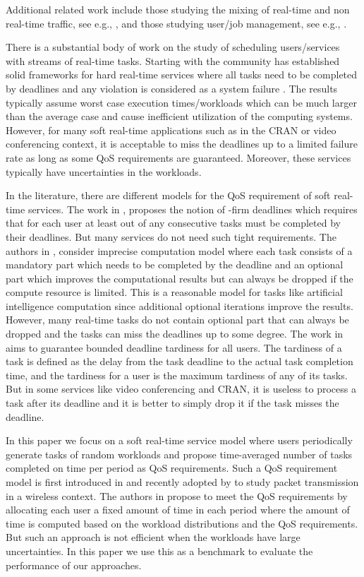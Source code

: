 \documentclass[prodmode,acmtompecs]{acmsmall}
\newcommand{\myComments}[1]{}
\newif\ifdissertation
\newcommand{\dissertationStart}{\ifdissertation  \myComments{Dissertation version: }}
\begin{document}
Additional related work include those studying the mixing of real-time and non real-time traffic, see e.g., \cite{ShS01,JaS11,PaD07}, 
and those studying user/job management, see e.g., 
\cite{AAB00,MTH11,DeK14}. 

\dissertationStart
There is a substantial body of work on the study of scheduling users/services with streams of real-time tasks. 
Starting with \cite{LiL73A} the community has established solid frameworks for hard real-time services where all tasks need to be completed by deadlines and any violation is considered as a system failure \cite{Liu00b} \cite{DaB11A}. The results typically assume worst case execution times/workloads which can be much larger than the average case and cause inefficient utilization of the computing systems. However, for many soft real-time applications such as in the CRAN or video conferencing context, it is acceptable to miss the deadlines up to a limited failure rate as long as some QoS requirements are guaranteed. Moreover, these services typically have uncertainties in the workloads. 

In the literature, there are different models for the QoS requirement of soft real-time services. The work in \cite{HaR95A}, \cite{BeB97A} proposes the notion of -firm deadlines which requires that for each user at least  out of any  consecutive tasks must be completed by their deadlines. But many services do not need such tight requirements. The authors in \cite{LLN87A}, \cite{HoK13bA} consider imprecise computation model where each task consists of a mandatory part which needs to be completed by the deadline and an optional part which improves the computational results but can always be dropped if the compute resource is limited. This is a reasonable model for tasks like artificial intelligence computation since additional optional iterations improve the results. However, many real-time tasks do not contain optional part that can always be dropped and the tasks can miss the deadlines up to some degree. The work in \cite{LiA09A} aims to guarantee bounded deadline tardiness for all users. The tardiness of a task is defined as the delay from the task deadline to the actual task completion time, and the tardiness for a user is the maximum tardiness of any of its tasks. But in some services like video conferencing and CRAN, it is useless to process a task after its deadline and it is better to simply drop it if the task misses the deadline. 

In this paper we focus on a soft real-time service model where users periodically generate tasks of random workloads and propose time-averaged number of tasks completed on time per period as QoS requirements. Such a QoS requirement model is first introduced in \cite{AtB98A} and recently adopted by \cite{HoK13bA} \cite{HoK12A} to study packet transmission in a wireless context. The authors in \cite{AtB98A} propose to meet the QoS requirements by allocating each user a fixed amount of time in each period where the amount of time is computed based on the workload distributions and the QoS requirements. But such an approach is not efficient when the workloads have large uncertainties. In this paper we use this as a benchmark to evaluate the performance of our approaches. 
\end{document}
